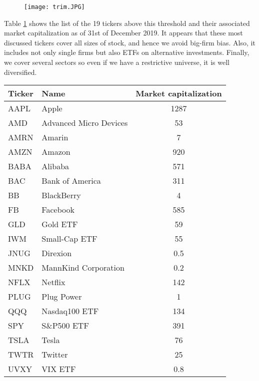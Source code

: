 \begin{figure}[h]
    \centering
    \texttt{[image: trim.JPG]}
    \label{fig:coverage}
\end{figure}

Table \ref{tab:listcov} shows the list of the 19 tickers above this threshold and their associated market capitalization as of 31st of December 2019. It appears that these most discussed tickers cover all sizes of stock, and hence we avoid big-firm bias. Also, it includes not only single firms but also ETFs on alternative investments. Finally, we cover several sectors so even if we have a restrictive universe, it is well diversified.

\begin{table}[h]
\centering
\begin{tabular}{l|l|c}
Ticker & Name                    & Market capitalization\\ \hline \hline
AAPL   & Apple                   & 1287\\
AMD    & Advanced Micro Devices  & 53 \\
AMRN   & Amarin                  & 7 \\
AMZN   & Amazon                  & 920 \\
BABA   & Alibaba                 & 571 \\
BAC    & Bank of America         & 311 \\
BB     & BlackBerry              & 4 \\
FB     & Facebook                & 585 \\
GLD    & Gold ETF                & 59 \\
IWM    & Small-Cap ETF           & 55 \\
JNUG   & Direxion                & 0.5 \\
MNKD   & MannKind Corporation    & 0.2 \\
NFLX   & Netflix                 & 142 \\
PLUG   & Plug Power              & 1 \\
QQQ    & Nasdaq100 ETF           & 134\\
SPY    & S\&P500 ETF             & 391 \\
TSLA   & Tesla                   & 76 \\
TWTR   & Twitter                 & 25 \\
UVXY   & VIX ETF                 & 0.8 \\
\end{tabular}
\label{tab:listcov}
\end{table}

